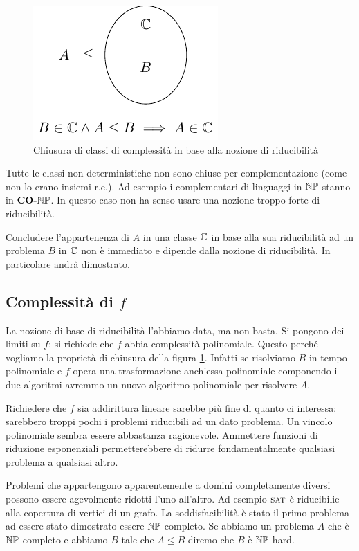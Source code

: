 \begin{figure}[h]
    \begin{center}
        \includegraphics{img/ReducibilityNotion.pdf}
    \end{center}
    \caption{Chiusura di classi di complessità in base alla nozione di riducibilità}
    \label{ReducibilityNotion}
\end{figure}

Tutte le classi non deterministiche non sono chiuse per complementazione (come non lo erano insiemi
r.e.). Ad esempio i complementari di linguaggi in $\mathbb{NP}$ stanno in $\textbf{CO-}\mathbb{NP}$. In questo caso
non ha senso usare una nozione troppo forte di riducibilità.

Concludere l'appartenenza di $A$ in una classe $\mathbb{C}$ in base alla sua riducibilità ad un
problema $B$ in $\mathbb{C}$ non è immediato e dipende dalla nozione di riducibilità. In particolare
andrà dimostrato.

\subsection{Complessità di $f$}

La nozione di base di riducibilità l'abbiamo data, ma non basta. Si pongono dei limiti su $f$: si
richiede che $f$ abbia complessità polinomiale. Questo perché vogliamo la proprietà di chiusura
della figura \ref{ReducibilityNotion}. Infatti se risolviamo $B$ in tempo polinomiale e $f$ opera
una trasformazione anch'essa polinomiale componendo i due algoritmi avremmo un nuovo algoritmo
polinomiale per risolvere $A$.

Richiedere che $f$ sia addirittura lineare sarebbe più fine di quanto ci interessa: sarebbero troppi
pochi i problemi riducibili ad un dato problema. Un vincolo polinomiale sembra essere abbastanza
ragionevole.  Ammettere funzioni di riduzione esponenziali permetterebbere di ridurre
fondamentalmente qualsiasi problema a qualsiasi altro.

Problemi che appartengono apparentemente a domini completamente diversi possono essere agevolmente
ridotti l'uno all'altro. Ad esempio $\textsc{sat}$ è riducibilie alla copertura di vertici di un grafo. La
soddisfacibilità è stato il primo problema ad essere stato dimostrato essere $\mathbb{NP}$-completo. Se
abbiamo un problema $A$ che è $\mathbb{NP}$-completo e abbiamo $B$ tale che $A \leq B$ diremo che $B$
è $\mathbb{NP}$-hard.

